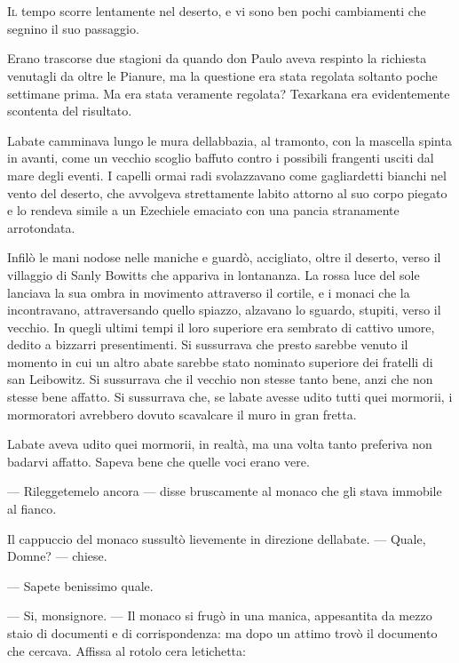 	\chapter{\phantom{title}}

\lettrine{I}{l} tempo scorre lentamente nel deserto, e vi sono ben pochi cambiamenti
che segnino il suo passaggio.

Erano trascorse due stagioni da quando don Paulo aveva respinto la
richiesta venutagli da oltre le Pianure, ma la questione era stata
regolata soltanto poche settimane prima. Ma era stata veramente
regolata? Texarkana era evidentemente scontenta del risultato.

L\textquotesingle abate camminava lungo le mura
dell\textquotesingle abbazia, al tramonto, con la mascella spinta in
avanti, come un vecchio scoglio baffuto contro i possibili frangenti
usciti dal mare degli eventi. I capelli ormai radi svolazzavano come
gagliardetti bianchi nel vento del deserto, che avvolgeva strettamente
l\textquotesingle abito attorno al suo corpo piegato e lo rendeva simile
a un Ezechiele emaciato con una pancia stranamente arrotondata.

Infilò le mani nodose nelle maniche e guardò, accigliato, oltre il
deserto, verso il villaggio di Sanly Bowitts che appariva in lontananza.
La rossa luce del sole lanciava la sua ombra in movimento attraverso il
cortile, e i monaci che la incontravano, attraversando quello spiazzo,
alzavano lo sguardo, stupiti, verso il vecchio. In quegli ultimi tempi
il loro superiore era sembrato di cattivo umore, dedito a bizzarri
presentimenti. Si sussurrava che presto sarebbe venuto il momento in cui
un altro abate sarebbe stato nominato superiore dei fratelli di san
Leibowitz. Si sussurrava che il vecchio non stesse tanto bene, anzi che
non stesse bene affatto. Si sussurrava che, se l\textquotesingle abate
avesse udito tutti quei mormorii, i mormoratori avrebbero dovuto
scavalcare il muro in gran fretta.

L\textquotesingle abate aveva udito quei mormorii, in realtà, ma una
volta tanto preferiva non badarvi affatto. Sapeva bene che quelle voci
erano vere.

--- Rileggetemelo ancora --- disse bruscamente al monaco che gli stava
immobile al fianco.

Il cappuccio del monaco sussultò lievemente in direzione
dell\textquotesingle abate. --- Quale, Domne? --- chiese.

--- Sapete benissimo quale.

--- Si, monsignore. --- Il monaco si frugò in una manica, appesantita da
mezzo staio di documenti e di corrispondenza: ma dopo un attimo trovò il
documento che cercava. Affissa al rotolo c\textquotesingle era
l\textquotesingle etichetta:

